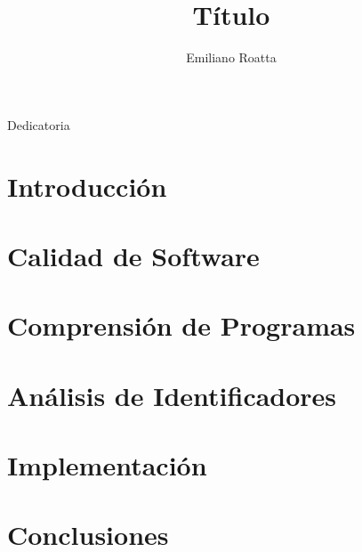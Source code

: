 \documentclass[a4paper,11pt,twoside,openright]{book}
\title{Título}
\author{Emiliano Roatta}
\begin{document}
\frontmatter

\maketitle

\begin{flushright}
\null{}
  Dedicatoria
\null
\end{flushright}



\tableofcontents
\listoffigures
\listoftables
\listofalgorithms

\mainmatter
\chapter{Introducción}


\chapter{Calidad de Software}


\chapter{Comprensión de Programas}






\chapter{Análisis de Identificadores}




\chapter{Implementación}





\chapter{Conclusiones}






\backmatter
\end{document}
